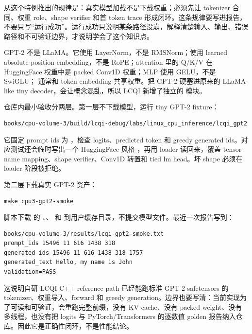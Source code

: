 从这个特例推出的规律是：真实模型加载不是下载权重；必须先让 tokenizer 合同、权重 role、shape verifier 和首 token trace 形成闭环。这条规律要写进报告，不要只写“运行成功”。运行成功只说明某条路径没崩，解释清楚输入、输出、错误路径和不可验证边界，才说明学会了这个知识点。


GPT-2 不是 LLaMA。它使用 LayerNorm，不是 RMSNorm；使用 learned absolute position embedding，不是 RoPE；attention 里的 Q/K/V 在 HuggingFace 权重中是 packed Conv1D 权重；MLP 使用 GELU，不是 SwiGLU； 通常和 token embedding 共享权重。把 GPT-2 硬塞进原来的 LLaMA-like tiny decoder，会让概念混乱，所以 LCQI 新增了独立的  模块。

仓库内最小验收分两层。第一层不下载模型，运行 tiny GPT-2 fixture：

\begin{lstlisting}[numbers=none,caption={仓库内 tiny GPT-2 数学闭环}]
books/cpu-volume-3/build/lcqi-debug/labs/linux_cpu_inference/lcqi_gpt2
\end{lstlisting}

它固定 prompt ids 为 ，检查 logits、predicted token 和 greedy generated ids。对应测试还会临时写出一个 HuggingFace 风格 ，再用 loader 读回来，覆盖 tensor name mapping、shape verifier、Conv1D 转置和 tied lm head。坏 shape 必须在 loader 阶段被拒绝。

第二层下载真实 GPT-2 资产：

\begin{lstlisting}[numbers=none,caption={LCQI 自研 GPT-2 smoke}]
make cpu3-gpt2-smoke
\end{lstlisting}

脚本下载  的 、、 和  到用户缓存目录，不提交模型文件。最近一次报告写到：

\begin{lstlisting}[numbers=none,caption={GPT-2 smoke 报告关键字段}]
books/cpu-volume-3/results/lcqi-gpt2-smoke.txt
prompt_ids 15496 11 616 1438 318
generated_ids 15496 11 616 1438 318 1757
generated_text Hello, my name is John
validation=PASS
\end{lstlisting}

这说明自研 LCQI C++ reference path 已经能跑标准 GPT-2 safetensors 的 tokenizer、权重导入、forward 和 greedy generation。边界也要写清：当前实现为了可读和可验证，会重跑完整前缀，没有 KV cache、没有 packed weight、没有多线程，也没有把 logits 与 PyTorch/Transformers 的逐数值 golden 报告纳入仓库。因此它是正确性闭环，不是性能结论。

